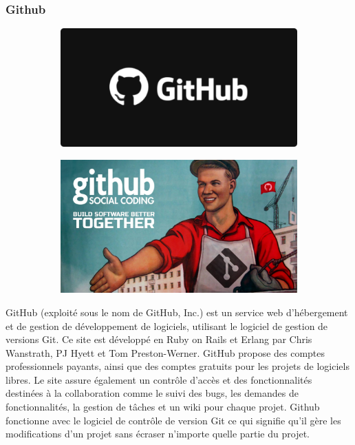 \documentclass{article}
\begin{document}
\subsubsection{Github}
\begin{figure}[h!]
	\centering
  	\begin{subfigure}[b]{0.4\linewidth}
    \includegraphics[width=\linewidth]{github.png}
	\end{subfigure}
    \begin{subfigure}[b]{0.5\linewidth}
	\includegraphics[width=\linewidth]{githubc.jpeg}
	\end{subfigure}
\end{figure}

GitHub (exploité sous le nom de GitHub, Inc.) est un service web d'hébergement et de gestion de développement de logiciels, utilisant le logiciel de gestion de versions Git. Ce site est développé en Ruby on Rails et Erlang par Chris Wanstrath, PJ Hyett et Tom Preston-Werner. GitHub propose des comptes professionnels payants, ainsi que des comptes gratuits pour les projets de logiciels libres. Le site assure également un contrôle d'accès et des fonctionnalités destinées à la collaboration comme le suivi des bugs, les demandes de fonctionnalités, la gestion de tâches et un wiki pour chaque projet. 
\newline
Github fonctionne avec le logiciel de contrôle de version Git ce qui signifie qu’il gère les modifications d’un projet sans écraser n’importe quelle partie du projet.
\end{document}
